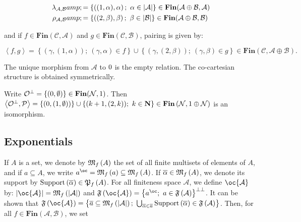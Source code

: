 \begin{align}
\lambda_{{\mathcal A},{\mathcal B}}&amp;=\left\{\left((1,\alpha),\alpha\right);\ \alpha\in\web{\mathcal A}\right\}
\in\mathbf{Fin}({\mathcal A}\oplus{\mathcal B},{\mathcal A}) \\
\rho_{{\mathcal A},{\mathcal B}}&amp;=\left\{\left((2,\beta),\beta\right);\ \beta\in\web{\mathcal B}\right\}
\in\mathbf{Fin}({\mathcal A}\oplus{\mathcal B},{\mathcal B}) 
\end{align}

and if \(f\in\mathbf{Fin}({\mathcal C},{\mathcal A})\) and
\(g\in\mathbf{Fin}({\mathcal C},{\mathcal B})\), pairing is given by:

\(\left\langle f,g\right\rangle = \left\{\left(\gamma,(1,\alpha)\right);\ (\gamma,\alpha)\in f\right\} \cup \left\{\left(\gamma,(2,\beta)\right);\ (\gamma,\beta)\in g\right\} \in\mathbf{Fin}({\mathcal C},{\mathcal A}\oplus{\mathcal B}).\)

The unique morphism from \({\mathcal A}\) to \(0\) is the empty
relation. The co-cartesian structure is obtained symmetrically.

\begin{example}\label{example.-2}
Write \({\mathcal O}^\bot=\left\{(0,\emptyset)\right\}\in\mathbf{Fin}({\mathcal N},1)\). Then \(\left\langle{{\mathcal O}^\bot},{\mathcal{P}}\right\rangle =\{ (0,(1,\emptyset)) \}\cup \{ (k+1,(2,k)) ;\  k\in{\mathbf N} \} \in\mathbf{Fin}\left({\mathcal N},1\oplus{\mathcal N}\right)\) is an isomorphism.
\end{example}

\subsection{Exponentials}\label{exponentials-1}

If \(A\) is a set, we denote by \(\mathfrak{M}_f\left(A\right)\) the set of all finite
multisets of elements of \(A\), and if \(a\subseteq A\), we write
\(a^{\oc}=\finmulset a\subseteq\finmulset A\). If
\(\overline\alpha\in\mathfrak{M}_f\left(A\right)\), we denote its support by
\(\mathrm{Support}\left(\overline \alpha\right)\in\mathfrak{P}_f\left(A\right)\). For
all finiteness space \({\mathcal A}\), we define \(\oc {\mathcal A}\)
by: \(\web{\oc {\mathcal A}}= \finmulset{\web{{\mathcal A}}}\) and
\(\mathfrak F\left(\oc{\mathcal A}\right)=\left\{a^{\oc};\  a\in\mathfrak F\left({\mathcal A}\right)\right\}\biorth\).
It can be shown that
\(\mathfrak F\left(\oc{\mathcal A}\right) = \left\{\overline a\subseteq\finmulset{\web{{\mathcal A}}};\ \bigcup_{\overline\alpha\in \overline a}\mathrm{Support}\left(\overline \alpha\right)\in\mathfrak F\left(\mathcal A\right)\right\}\).
Then, for all \(f\in\mathbf{Fin}({\mathcal A},{\mathcal B})\), we set


